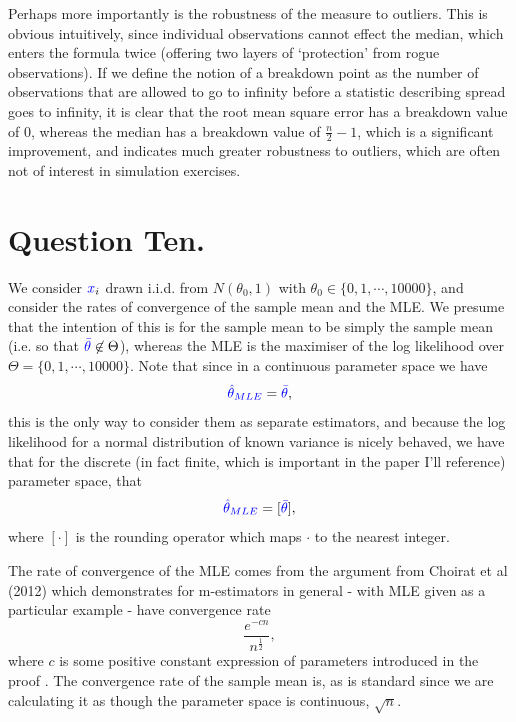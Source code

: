 \documentclass{article}
\renewcommand{\r}[1]{\textcolor{blue}{#1}}
\begin{document}
Perhaps more importantly is the robustness of the measure to outliers. This is obvious intuitively, since individual observations cannot effect the median, which enters the formula twice (offering two layers of `protection' from rogue observations). If we define the notion of a breakdown point as the number of observations that are allowed to go to infinity before a statistic describing spread goes to infinity, it is clear that the root mean square error has a breakdown value of 0\cite{leys2013}, whereas the median has a breakdown value of $\frac{n}{2}-1$, which is a significant improvement, and indicates much greater robustness to outliers, which are often not of interest in simulation exercises.


\section{Question Ten.}
We consider $\r{x}_{i}$ drawn i.i.d. from $N(\theta_{0},1)$ with $\theta_{0}\in\{0,1,\cdots,10000\}$, and consider the rates of convergence of the sample mean and the MLE. We presume that the intention of this is for the sample mean to be simply the sample mean (i.e. so that $\r{\bar{\theta}}\not\in\Theta$), whereas the MLE is the maximiser of the log likelihood over $\Theta=\{0,1,\cdots,10000\}$. Note that since in a continuous parameter space we have 
\begin{equation} \r{\hat{\theta}_{MLE}}=\r{\bar{\theta}},\end{equation}
this is the only way to consider them as separate estimators, and because the log likelihood for a normal distribution of known variance is nicely behaved, we have that for the discrete (in fact finite, which is important in the paper I'll reference) parameter space, that
\begin{equation} \r{\hat{\theta}_{MLE}}=[\r{\bar{\theta}}],\end{equation} 
where $[\cdot]$ is the rounding operator which maps $\cdot$ to the nearest integer.

The rate of convergence of the MLE comes from the argument from Choirat et al (2012) which demonstrates for m-estimators in general - with MLE given as a particular example - have convergence rate
\begin{equation}\label{eqn:rate} \frac{e^{-cn}}{n^{\frac{1}{2}}},\end{equation}
where $c$ is some positive constant expression of parameters introduced in the proof \cite{choirat2012}. The convergence rate of the sample mean is, as is standard since we are calculating it as though the parameter space is continuous, $\sqrt{n}$.
\end{document}
